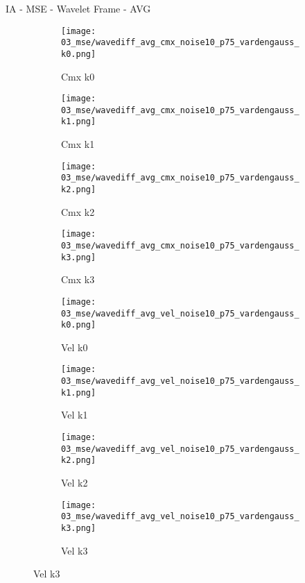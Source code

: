 \documentclass{beamer}
\begin{document}
\begin{frame}{IA - MSE - Wavelet Frame - AVG}{}
\begin{figure}
\begin{subfigure}{0.24\textwidth}
\texttt{[image: 03\_mse/wavediff\_avg\_cmx\_noise10\_p75\_vardengauss\_k0.png]}
\vspace{-20pt}
\caption*{\tiny Cmx k0}
\end{subfigure}
\begin{subfigure}{0.24\textwidth}
\texttt{[image: 03\_mse/wavediff\_avg\_cmx\_noise10\_p75\_vardengauss\_k1.png]}
\vspace{-20pt}
\caption*{\tiny Cmx k1}
\end{subfigure}
\begin{subfigure}{0.24\textwidth}
\texttt{[image: 03\_mse/wavediff\_avg\_cmx\_noise10\_p75\_vardengauss\_k2.png]}
\vspace{-20pt}
\caption*{\tiny Cmx k2}
\end{subfigure}
\begin{subfigure}{0.24\textwidth}
\texttt{[image: 03\_mse/wavediff\_avg\_cmx\_noise10\_p75\_vardengauss\_k3.png]}
\vspace{-20pt}
\caption*{\tiny Cmx k3}
\end{subfigure}

\begin{subfigure}{0.24\textwidth}
\texttt{[image: 03\_mse/wavediff\_avg\_vel\_noise10\_p75\_vardengauss\_k0.png]}
\vspace{-20pt}
\caption*{\tiny Vel k0}
\end{subfigure}
\begin{subfigure}{0.24\textwidth}
\texttt{[image: 03\_mse/wavediff\_avg\_vel\_noise10\_p75\_vardengauss\_k1.png]}
\vspace{-20pt}
\caption*{\tiny Vel k1}
\end{subfigure}
\begin{subfigure}{0.24\textwidth}
\texttt{[image: 03\_mse/wavediff\_avg\_vel\_noise10\_p75\_vardengauss\_k2.png]}
\vspace{-20pt}
\caption*{\tiny Vel k2}
\end{subfigure}
\begin{subfigure}{0.24\textwidth}
\texttt{[image: 03\_mse/wavediff\_avg\_vel\_noise10\_p75\_vardengauss\_k3.png]}
\vspace{-20pt}
\caption*{\tiny Vel k3}
\end{subfigure}
\end{figure}
\end{frame}
\end{document}
